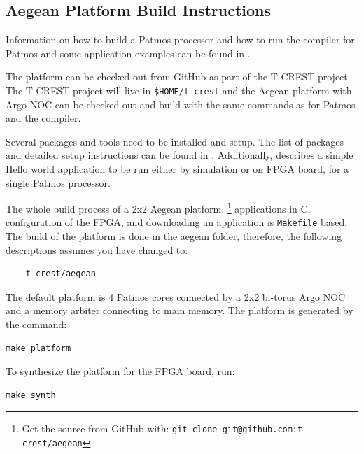 \documentclass[a4paper,fontsize=10pt,twoside,DIV15,BCOR12mm,headinclude=true,footinclude=false,pagesize,bibtotoc]{scrbook}
\newcommand{\code}[1]{{\texttt{#1}}}
\begin{document}
\subsection{Aegean Platform Build Instructions}

Information on how to build a Patmos processor and how to run the compiler for Patmos and some application examples
can be found in \cite{patmos-handbook}. 

The platform can be checked out from GitHub as part of the T-CREST project.
The T-CREST project will live in \code{\$HOME/t-crest} and the Aegean platform with Argo NOC
can be checked out and build with the same commands as for Patmos and the compiler.%



Several packages and tools need to be installed and setup. The list of packages 
and detailed setup instructions can be found in \cite{patmos-handbook}.
Additionally, \cite{patmos-handbook} describes a simple Hello world application 
to be run either by simulation or on FPGA board, for a single Patmos processor.


The whole build process of a 2x2 Aegean platform,
\footnote{Get the source from GitHub with: \code{git clone git@github.com:t-crest/aegean}} 
applications %
in C, configuration of the FPGA, and downloading an application
is \code{Makefile} based. The build of the platform is done in the aegean folder,
therefore, the following descriptions assumes you have changed to:

\begin{verbatim}
	t-crest/aegean
\end{verbatim}

The default platform is 4 Patmos cores connected by a 2x2 bi-torus Argo NOC 
and a memory arbiter connecting to main memory.
The platform is generated by the command:

\begin{verbatim}
make platform
\end{verbatim}

To synthesize the platform for the FPGA board, run:%

\begin{verbatim}
make synth
\end{verbatim}
\end{document}

